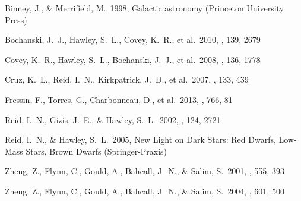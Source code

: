 \documentclass[preprint]{aastex}
\begin{document}
\acknowledgements

\clearpage

\begin{thebibliography}{}

 Binney, J.,
  \& Merrifield, M.\ 1998, Galactic astronomy (Princeton University
  Press)

 Bochanski,
  J.~J., Hawley, S.~L., Covey, K.~R., et al.\ 2010, \aj, 139, 2679


 Covey, K.~R.,
  Hawley, S.~L., Bochanski, J.~J., et al.\ 2008, \aj, 136, 1778

 Cruz, K.~L., Reid,
  I.~N., Kirkpatrick, J.~D., et al.\ 2007, \aj, 133, 439
  
 Fressin, F., Torres, 
G., Charbonneau, D., et al.\ 2013, \apj, 766, 81 

 Reid, I.~N., Gizis,
  J.~E., \& Hawley, S.~L.\ 2002, \aj, 124, 2721

 Reid, I.~N., \&
  Hawley, S.~L.\ 2005, New Light on Dark Stars: Red Dwarfs, Low-Mass
  Stars, Brown Dwarfs (Springer-Praxis)

 Zheng, Z., Flynn,
  C., Gould, A., Bahcall, J.~N., \& Salim, S.\ 2001, \apj, 555, 393

 Zheng, Z., Flynn,
  C., Gould, A., Bahcall, J.~N., \& Salim, S.\ 2004, \apj, 601, 500

\end{thebibliography}
\end{document}
